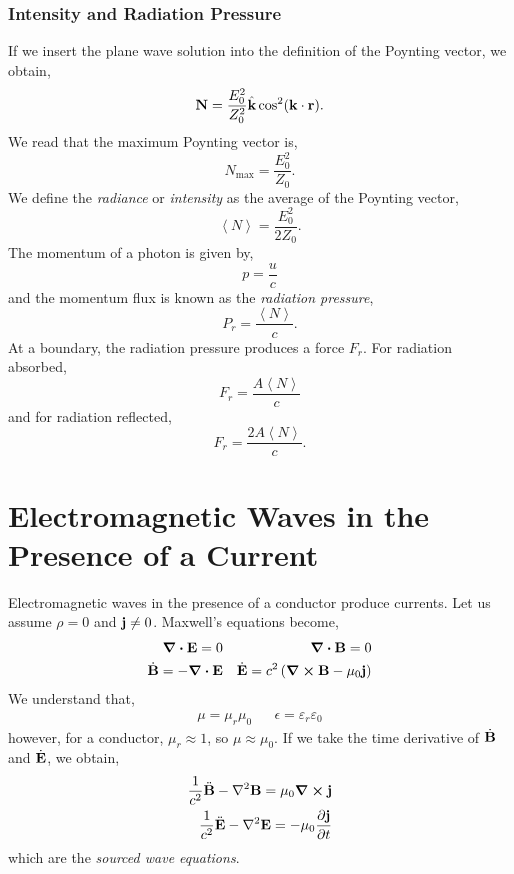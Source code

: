 \documentclass{book}
\begin{document}
\subsubsection{Intensity and Radiation Pressure}
If we insert the plane wave solution into the definition of the Poynting vector, we obtain,
\begin{equation}
	\vb{N} = \frac{E_0^2}{Z_0^2}\hat{\vb{k}}\cos^2(\vb{k}\cdot{\vb{r}}).
\end{equation}
We read that the maximum Poynting vector is,
\begin{equation}
	N_{\text{max}} = \frac{E_0^2}{Z_0}.
\end{equation}
We define the \textit{radiance} or \textit{intensity} as the average of the Poynting vector,
\begin{equation}
	\left<N\right> = \frac{E_0^2}{2Z_0}.
\end{equation}
The momentum of a photon is given by,
\begin{equation}
	p = \frac{u}{c}
\end{equation}
and the momentum flux is known as the \textit{radiation pressure},
\begin{equation}
	P_r = \frac{\left<N\right>}{c}.
\end{equation}
At a boundary, the radiation pressure produces a force $F_r$. For radiation absorbed,
\begin{equation}
	F_r = \frac{A\left<N\right>}{c}
\end{equation}
and for radiation reflected,
\begin{equation}
	F_r = \frac{2A\left<N\right>}{c}.
\end{equation}
\section{Electromagnetic Waves in the Presence of a Current}
Electromagnetic waves in the presence of a conductor produce currents. Let us assume $\rho = 0$ and $\vb{j} \neq 0$. Maxwell's equations become,
\begin{align}
	\div{\vb{E}} = 0 && \div{\vb{B}} = 0 \\
	\Dot{\vb{B}} = -\div{\vb{E}} && \Dot{\vb{E}} = c^2\left(\curl{\vb{B}} - \mu_0\vb{j}\right)
\end{align}
We understand that,
\begin{align}
	\mu = \mu_r\mu_0 && \epsilon = \varepsilon_r \varepsilon_0 
\end{align}
however, for a conductor, $\mu_r \approx 1$, so $\mu \approx \mu_0$. If we take the time derivative of $\Dot{\vb{B}}$ and $\Dot{\vb{E}}$, we obtain,
\begin{align}
	\frac{1}{c^2}\Ddot{\vb{B}} - \laplacian{\vb{B}} = \mu_0\curl{\vb{j}} \label{eq:sourced E}\\
	\frac{1}{c^2}\Ddot{\vb{E}} - \laplacian{\vb{E}} = -\mu_0 \pdv{\vb{j}}{t}
\end{align}
which are the \textit{sourced wave equations}.
\end{document}
